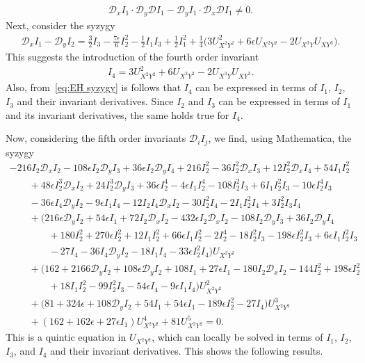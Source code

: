 \documentclass[10pt,a4paper]{amsart}
\numberwithin{equation}{section}
\newcommand{\D}{\mathcal{D}}
\begin{document}
\begin{gather*}
\D_xI_1\cdot \D_y\D I_1 - \D_yI_1\cdot \D_x\D I_1\neq 0.
\end{gather*}
Next, consider the syzygy
%
\begin{gather}\label{eq:EH syzygy}
\mathcal{D}_xI_1-\mathcal{D}_yI_2 = \frac{3}{2}I_3 - \frac{7\epsilon}{6}I_2^2 - \frac{1}{2}I_1I_3+\frac{1}{2}I_1^2+\frac{1}{4}\big(3U_{X^2Y^2}^2 + 6\epsilon U_{X^2Y^2}-2U_{X^3Y}U_{XY^3}\big).
\end{gather}
%
This suggests the introduction of the fourth order invariant
\begin{gather*}
I_4=3U_{X^2Y^2}^2+6U_{X^2Y^2} - 2U_{X^3Y}U_{XY^3}.
\end{gather*}
Also, from~\eqref{eq:EH syzygy} is follows that $I_4$ can be expressed in terms of $I_1$, $I_2$, $I_3$ and their invariant derivatives. Since $I_2$ and $I_3$ can be expressed in terms of $I_1$ and its invariant derivatives, the same holds true for $I_4$.

Now, considering the fifth order invariants $\D_i I_j$, we find, using {\sc Mathematica}, the syzygy
%
\begin{gather*}
-216 I_2 \D_xI_2 - 108\epsilon I_2\D_yI_3 + 36\epsilon I_2 \D_yI_4 + 216I_2^2 - 36I_2^2\D_xI_3 + 12I_2^2\D_xI_4 + 54 I_1I_2^2
\\ \qquad
{}+ 48\epsilon I_2^3\D_xI_2 + 24 I_2^3\D_yI_3 + 36\epsilon I_2^4 - 4\epsilon I_1I_2^4 - 108I_2^2I_3 + 6I_1I_2^2I_3-10\epsilon I_2^4I_3
\\ \qquad
{}-36\epsilon I_4\D_yI_2 - 9\epsilon I_1I_4 - 12I_2I_4\D_xI_2 - 30I_2^2I_4 - 2I_1I_2^2I_4 + 3I_2^2I_3I_4
\\ \qquad
{}+ \big(216\epsilon \D_yI_2+54\epsilon I_1+ 72I_2\D_xI_2
- 432\epsilon I_2\D_xI_2 - 108I_2\D_yI_3 + 36I_2\D_yI_4
\\ \qquad\qquad
{}+ 180I_2^2 + 270\epsilon I_2^2 + 12 I_1I_2^2+ 66\epsilon I_1I_2^2 - 2I_2^4 -18I_2^2I_3-198\epsilon I_2^2I_3+6\epsilon I_1I_2^2I_3
\\ \qquad\qquad
{}-27I_4 - 36I_4\D_yI_2 - 18I_1I_4 -33\epsilon I_2^2I_4\big)U_{X^2Y^2}
\\ \qquad
{}+ \big(162 + 2166 \D_yI_2 + 108\epsilon \D_yI_2 + 108I_1+27\epsilon I_1
-180I_2\D_xI_2-144I_2^2+198\epsilon I_2^2
\\ \qquad\qquad
{}+18I_1I_2^2 -99I_2^2I_3-54\epsilon I_4-9\epsilon I_1I_4\big)U_{X^2Y^2}^2
\\ \qquad
{}+ \big(81+324\epsilon +108\D_yI_2 + 54I_1+54\epsilon I_1 -189\epsilon I_2^2
- 27I_4\big)U_{X^2Y^2}^3
\\ \qquad
{}+ (162+162\epsilon+27\epsilon I_1)U_{X^2Y^2}^4 + 81U_{X^2Y^2}^5 = 0.
\end{gather*}
This is a quintic equation in $U_{X^2Y^2}$, which can locally be solved in terms of $I_1$, $I_2$, $I_3$, and $I_4$ and their invariant derivatives. This shows the following results.
\end{document}
